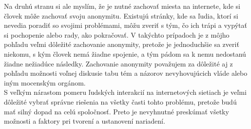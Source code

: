 \documentclass{article}
\begin{document}
Na druhú stranu si ale myslím, že je nutné zachovať miesta na internete, kde si človek môže zachovať svoju anonymitu. Existujú stránky, kde sa ľudia, ktorí si nevedia poradiť so svojimi problémami, môžu zveriť s tým, čo ich trápi a vypýtať si pochopenie alebo rady, ako pokračovať. V takýchto prípadoch je z môjho pohľadu veľmi dôležité zachovanie anonymity, pretože je jednoduchšie sa zveriť niekomu, s kým človek nemá žiadne spojenie, a tým pádom sa k nemu nedostanú žiadne nežiadúce následky. Zachovanie anonymity považujem za dôležité aj z pohľadu možnosti voľnej diskusie tabu tém a názorov nevyhovujúcich vláde alebo iným mocenským orgánom.\\

S veľkým nárastom pomeru ľudských interakcií na internetových sietiach je veľmi dôležité vybrať správne riešenia na všetky časti tohto problému, pretože budú mať silný dopad na celú spoločnosť. Preto je nevyhnutné preskúmať všetky možnosti a faktory pri tvorení a ustanovení nariadení.\\

\printbibliography[heading=bibintoc]
\end{document}
